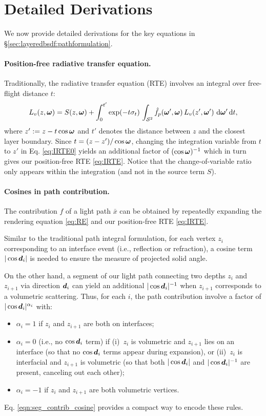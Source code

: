 \section{Detailed Derivations}
\label{sec:layeredbsdf:derivation}

We now provide detailed derivations for the key equations in \S\ref{sec:layeredbsdf:pathformulation}.

\paragraph{Position-free radiative transfer equation.}
Traditionally, the radiative transfer equation (RTE) involves an integral over free-flight distance $t$:
\begin{equation}
\label{eq:IRTE0}
  L_v(z, \bm{\omega}) = S(z, \bm{\omega}) + \int_0^{t'} \exp(-t \sigma_t) \, \int_{{\mathcal S^2}} \hat f_p(\bm{\omega}', \bm{\omega}) \, L_v(z', \bm{\omega}') \,\,\mathrm{d} \bm{\omega}' \,\mathrm{d} t,
\end{equation}
where $z' := z - t\cos\bm{\omega}$ and $t'$ denotes the distance between $z$ and the closest layer boundary.
Since $t = (z - z')/\cos\bm{\omega}$, changing the integration variable from $t$ to $z'$ in Eq. \eqref{eq:IRTE0} yields an additional factor of $(\cos\bm{\omega})^{-1}$ which in turn gives our position-free RTE \eqref{eq:IRTE}.
Notice that the change-of-variable ratio only appears within the integration (and not in the source term $S$).

\paragraph{Cosines in path contribution.}
The contribution $f$ of a light path $\bar{x}$ can be obtained by repeatedly expanding the rendering equation \eqref{eq:RE} and our position-free RTE \eqref{eq:IRTE}.

Similar to the traditional path integral formulation, for each vertex $z_i$ corresponding to an interface event (i.e., reflection or refraction), a cosine term $|\cos\bm{d}_i|$ is needed to ensure the measure of projected solid angle.

On the other hand, a segment of our light path connecting two depths $z_i$ and $z_{i + 1}$ via direction $\bm{d}_i$ can yield an additional $|\cos\bm{d}_i|^{-1}$ when $z_{i + 1}$ corresponds to a volumetric scattering.
Thus, for each $i$, the path contribution involve a factor of $|\cos\bm{d}_i|^{\alpha_i}$ with:
\begin{itemize}
	\item $\alpha_i = 1$ if $z_i$ and $z_{i + 1}$ are both on interfaces;
	\item $\alpha_i = 0$ (i.e., no $\cos\bm{d}_i$ term) if (i)~$z_i$ is volumetric and $z_{i + 1}$ lies on an interface (so that no $\cos\bm{d}_i$ terms appear during expansion), or (ii)~$z_i$ is interfacial and $z_{i + 1}$ is volumetric (so that both $|\cos\bm{d}_i|$ and $|\cos\bm{d}_i|^{-1}$ are present, canceling out each other);
	\item $\alpha_i = -1$ if $z_i$ and $z_{i + 1}$ are both volumetric vertices.
\end{itemize}
Eq. \eqref{eqn:seg_contrib_cosine} provides a compact way to encode these rules. 
